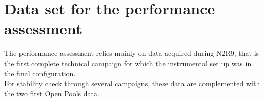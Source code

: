 \section{Data set for the performance assessment}

The performance assessment relies mainly on data acquired during N2R9, that is the first complete technical campaign for which the instrumental set up was in the final configuration. \\
For stability check through several campaigns, these data are complemented with the two first Open Pools data. 
